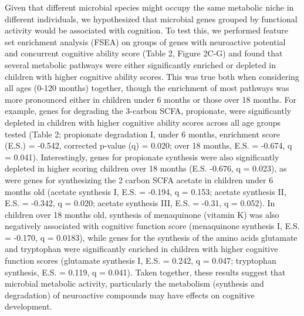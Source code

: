 \documentclass{article}
\begin{document}
Given that different microbial species might occupy the same metabolic
niche in different individuals, we hypothesized that microbial genes
grouped by functional activity would be associated with cognition. To
test this, we performed feature set enrichment analysis (FSEA) on groups
of genes with neuroactive potential
\cite{valles-colomerNeuroactivePotentialHuman2019}
and concurrent cognitive ability score (Table 2, Figure 2C-G) and found that
several metabolic pathways were either significantly enriched or depleted in
children with higher cognitive ability scores. This was true both when
considering all ages (0-120 months) together, though the enrichment of most
pathways was more pronounced either in children under 6 months or those over 18
months. For example, genes for degrading the 3-carbon SCFA, propionate,
were significantly depleted in children with higher cognitive ability
scores across all age groups tested (Table 2; propionate degradation I,
under 6 months, enrichment score (E.S.) = -0.542, corrected p-value (q)
= 0.020; over 18 months, E.S. = -0.674, q = 0.041). Interestingly, genes
for propionate synthesis were also significantly depleted in higher
scoring children over 18 months (E.S. -0.676, q = 0.023), as were genes
for synthesizing the 2 carbon SCFA acetate in children under 6 months
old (acetate synthesis I, E.S. = -0.194, q = 0.153; acetate synthesis
II, E.S. = -0.342, q = 0.020; acetate synthesis III, E.S. = -0.31, q = 0.052).
In children over 18 months old, synthesis of menaquinone (vitamin K)
was also negatively associated with cognitive function score (menaquinone synthesis I,
E.S. = -0.170, q = 0.0183), while
genes for the synthesis of the amino acids
glutamate and tryptophan were significantly enriched in children with
higher cognitive function scores (glutamate synthesis I, E.S. = 0.242, 
q = 0.047; tryptophan synthesis, E.S. = 0.119, q = 0.041).
Taken together, these results suggest that
microbial metabolic activity, particularly the metabolism (synthesis and
degradation) of neuroactive compounds may have effects on cognitive
development.
\end{document}
